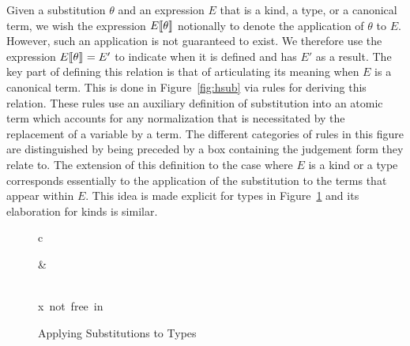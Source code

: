 Given a substitution $\theta$ and an expression $E$ that is a kind, a
type, or a canonical term, we wish the expression
$E\llbracket {\theta} \rrbracket$ notionally to denote the application of $\theta$
to $E$.
However, such an application is not guaranteed to exist.
%
We therefore use the expression $E\llbracket {\theta} \rrbracket_{} = E'$ to indicate
when it is defined and has $E'$ as a result.
%
The key part of defining this relation is that of articulating
its meaning when $E$ is a canonical term.
%
This is done in Figure~\ref{fig:hsub} via rules for deriving this
relation. 
%
These rules use an auxiliary definition of substitution into an
atomic term which accounts for any normalization that is necessitated
by the replacement of a variable by a term.
%
The different categories of rules in this figure are distinguished by
being preceded by a box containing the judgement form they relate to.
%
The extension of this definition to the case where $E$ is a kind or a type
corresponds essentially to the application of the substitution to the
terms that appear within $E$. 
%
This idea is made explicit for types in Figure~\ref{fig:hsubtypes} and its
elaboration for kinds is similar.
%


\begin{figure}[tbhp]
\begin{center}
\begin{tabular}{c}
      { }

\qquad \qquad
  
      { &
       }

\\[10pt]

      {x\ \mbox{\rm not free in}\ \domain{\theta} \cup \range{\theta}
        \qquad
         \qquad
       }
\end{tabular}
\end{center}

\caption{Applying Substitutions to Types}
\label{fig:hsubtypes}
\end{figure}

